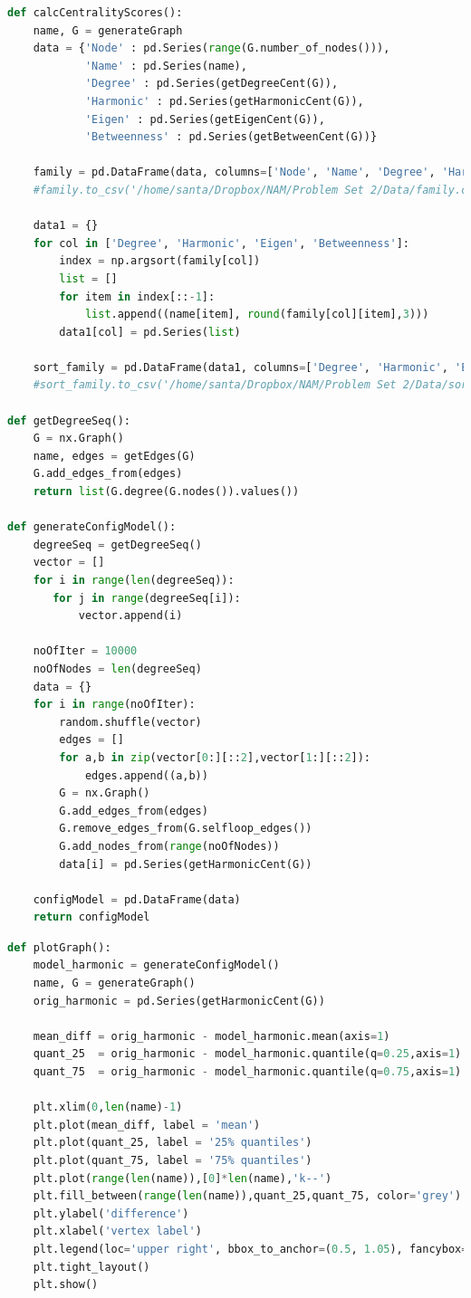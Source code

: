 \documentclass{article}
\begin{document}
\begin{lstlisting}[language=Python, breaklines=true] 
def calcCentralityScores():
    name, G = generateGraph
    data = {'Node' : pd.Series(range(G.number_of_nodes())),
            'Name' : pd.Series(name),
            'Degree' : pd.Series(getDegreeCent(G)),
            'Harmonic' : pd.Series(getHarmonicCent(G)),
            'Eigen' : pd.Series(getEigenCent(G)),
            'Betweenness' : pd.Series(getBetweenCent(G))}
    
    family = pd.DataFrame(data, columns=['Node', 'Name', 'Degree', 'Harmonic', 'Eigen', 'Betweenness'])
    #family.to_csv('/home/santa/Dropbox/NAM/Problem Set 2/Data/family.csv', index=False)
    
    data1 = {}
    for col in ['Degree', 'Harmonic', 'Eigen', 'Betweenness']:
        index = np.argsort(family[col])
        list = []
        for item in index[::-1]:
            list.append((name[item], round(family[col][item],3)))
        data1[col] = pd.Series(list)
    
    sort_family = pd.DataFrame(data1, columns=['Degree', 'Harmonic', 'Eigen', 'Betweenness'])
    #sort_family.to_csv('/home/santa/Dropbox/NAM/Problem Set 2/Data/sort_family.csv', index=False)

def getDegreeSeq():
    G = nx.Graph()
    name, edges = getEdges(G)
    G.add_edges_from(edges)
    return list(G.degree(G.nodes()).values())

def generateConfigModel():
    degreeSeq = getDegreeSeq()
    vector = []
    for i in range(len(degreeSeq)):
       for j in range(degreeSeq[i]):
           vector.append(i)
    
    noOfIter = 10000
    noOfNodes = len(degreeSeq)
    data = {}
    for i in range(noOfIter):
        random.shuffle(vector)
        edges = []
        for a,b in zip(vector[0:][::2],vector[1:][::2]):
            edges.append((a,b))
        G = nx.Graph()
        G.add_edges_from(edges)
        G.remove_edges_from(G.selfloop_edges())
        G.add_nodes_from(range(noOfNodes))
        data[i] = pd.Series(getHarmonicCent(G))
    
    configModel = pd.DataFrame(data)
    return configModel
\end{lstlisting}
\newpage 
\begin{lstlisting}[language=Python]   
def plotGraph():
    model_harmonic = generateConfigModel()
    name, G = generateGraph()
    orig_harmonic = pd.Series(getHarmonicCent(G))
    
    mean_diff = orig_harmonic - model_harmonic.mean(axis=1)
    quant_25  = orig_harmonic - model_harmonic.quantile(q=0.25,axis=1)
    quant_75  = orig_harmonic - model_harmonic.quantile(q=0.75,axis=1)
    
    plt.xlim(0,len(name)-1)
    plt.plot(mean_diff, label = 'mean')
    plt.plot(quant_25, label = '25% quantiles')
    plt.plot(quant_75, label = '75% quantiles')
    plt.plot(range(len(name)),[0]*len(name),'k--')
    plt.fill_between(range(len(name)),quant_25,quant_75, color='grey')
    plt.ylabel('difference')
    plt.xlabel('vertex label')
    plt.legend(loc='upper right', bbox_to_anchor=(0.5, 1.05), fancybox=True, shadow=True)
    plt.tight_layout()
    plt.show()
\end{lstlisting}
\end{document}

